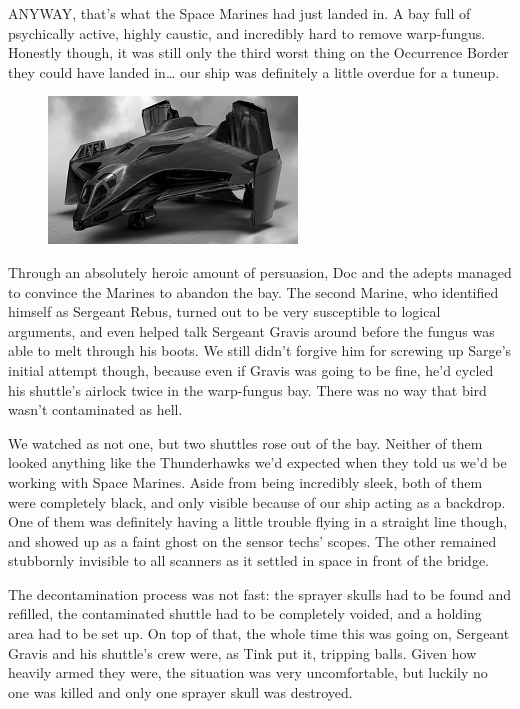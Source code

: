 ANYWAY, that's what the Space Marines had just landed in. 
A bay full of psychically active, highly caustic, and incredibly hard to remove warp-fungus. 
Honestly though, it was still only the third worst thing on the Occurrence Border they could have landed in… our ship was definitely a little overdue for a tuneup.
\begin{figure}
	\begin{center}
		\includegraphics[width=\figwidth]{pics/12/19.png}
	\end{center}
\end{figure}
Through an absolutely heroic amount of persuasion, Doc and the adepts managed to convince the Marines to abandon the bay. 
The second Marine, who identified himself as Sergeant Rebus, turned out to be very susceptible to logical arguments, and even helped talk Sergeant Gravis around before the fungus was able to melt through his boots. 
We still didn't forgive him for screwing up Sarge's initial attempt though, because even if Gravis was going to be fine, he'd cycled his shuttle's airlock twice in the warp-fungus bay. 
There was no way that bird wasn't contaminated as hell.

We watched as not one, but two shuttles rose out of the bay. 
Neither of them looked anything like the Thunderhawks we'd expected when they told us we'd be working with Space Marines. 
Aside from being incredibly sleek, both of them were completely black, and only visible because of our ship acting as a backdrop. 
One of them was definitely having a little trouble flying in a straight line though, and showed up as a faint ghost on the sensor techs' scopes. 
The other remained stubbornly invisible to all scanners as it settled in space in front of the bridge.

The decontamination process was not fast: 
the sprayer skulls had to be found and refilled, the contaminated shuttle had to be completely voided, and a holding area had to be set up. 
On top of that, the whole time this was going on, Sergeant Gravis and his shuttle's crew were, as Tink put it, tripping balls. 
Given how heavily armed they were, the situation was very uncomfortable, but luckily no one was killed and only one sprayer skull was destroyed.

